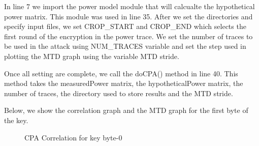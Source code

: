 \documentclass[letterpaper,10pt,english]{sphinxmanual}
\let\sphinxpxdimen\pdfpxdimen\else\newdimen\sphinxpxdimen
\begin{document}
\begin{sphinxVerbatim}[commandchars=\\\{\},numbers=left,firstnumber=1,stepnumber=1]
      
      
      
      


   
\end{sphinxVerbatim}

In line 7 we import the power model module that will calcualte the hypothetical power matrix.
This module was used in line 35.
After we set the directories and specify input files, we set CROP\_START and CROP\_END which
selects the first round of the encryption in the power trace.
We set the number of traces to be used in the attack using NUM\_TRACES variable and set the step
used in plotting the MTD graph using the variable MTD stride.

Once all setting are complete, we call the doCPA() method in line 40. This method takes the measuredPower matrix,
the hypotheticalPower matrix, the number of traces, the directory used to store results and the MTD stride.

Below, we show the correlation graph and the MTD graph for the first byte of the key.

\begin{figure}[htbp]
\centering
\capstart

\noindent\sphinxincludegraphics[height=350\sphinxpxdimen]{{cpa_correlation}.png}
\caption{CPA Correlation for key byte-0}\label{\detokenize{aes_cpa_example2:id2}}\end{figure}
\end{document}
